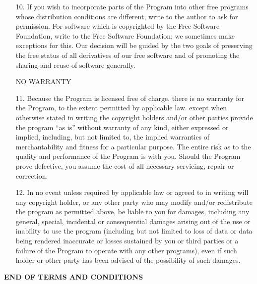 \begin{enumerate}
\item [10.] If you wish to incorporate parts of the Program into other free
      programs whose distribution conditions are different, write to the
      author to ask for permission.  For software which is copyrighted by the
      Free Software Foundation, write to the Free Software Foundation; we
      sometimes make exceptions for this.  Our decision will be guided by the
      two goals of preserving the free status of all derivatives of our free
      software and of promoting the sharing and reuse of software generally.

\begin{center}
NO WARRANTY
\end{center}

\bfseries

\item [11.] Because the Program is licensed free of charge, there is no
      warranty for the Program, to the extent permitted by applicable law.
      except when otherwise stated in writing the copyright holders and/or
      other parties provide the program ``as is'' without warranty of any
      kind, either expressed or implied, including, but not limited to, the
      implied warranties of merchantability and fitness for a particular
      purpose.  The entire risk as to the quality and performance of the
      Program is with you.  Should the Program prove defective, you assume
      the cost of all necessary servicing, repair or correction.

\item [12.] In no event unless required by applicable law or agreed to in
      writing will any copyright holder, or any other party who may modify
      and/or redistribute the program as permitted above, be liable to you
      for damages, including any general, special, incidental or
      consequential damages arising out of the use or inability to use the
      program (including but not limited to loss of data or data being
      rendered inaccurate or losses sustained by you or third parties or a
      failure of the Program to operate with any other programs), even if
      such holder or other party has been advised of the possibility of such
      damages.

\end{enumerate}

\begin{center}
\textbf{END OF TERMS AND CONDITIONS}
\end{center}

